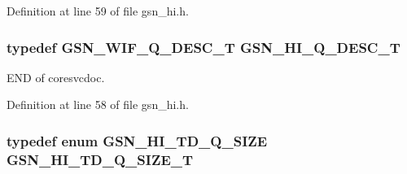 Definition at line 59 of file gsn\_\-hi.h.

\hypertarget{a00504_a3905dedc9ed3f124095eadfed4f5abe5}{
\subsubsection[{GSN\_\-HI\_\-Q\_\-DESC\_\-T}]{\setlength{\rightskip}{0pt plus 5cm}typedef {\bf GSN\_\-WIF\_\-Q\_\-DESC\_\-T} {\bf GSN\_\-HI\_\-Q\_\-DESC\_\-T}}}
\label{a00504_a3905dedc9ed3f124095eadfed4f5abe5}
END of coresvcdoc. 

Definition at line 58 of file gsn\_\-hi.h.

\hypertarget{a00504_acb6d991a21f18903617a0d1f76669715}{
\subsubsection[{GSN\_\-HI\_\-TD\_\-Q\_\-SIZE\_\-T}]{\setlength{\rightskip}{0pt plus 5cm}typedef enum {\bf GSN\_\-HI\_\-TD\_\-Q\_\-SIZE} {\bf GSN\_\-HI\_\-TD\_\-Q\_\-SIZE\_\-T}}}
\label{a00504_acb6d991a21f18903617a0d1f76669715}


